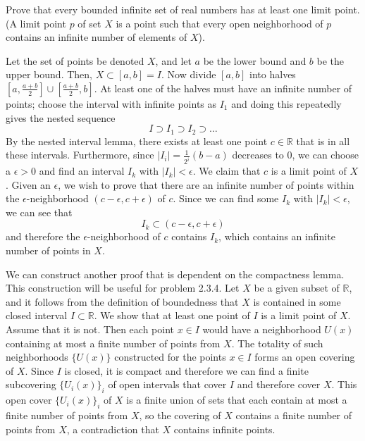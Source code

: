   \begin{exercise}
    Prove that every bounded infinite set of real numbers has at least one limit point. (A limit point $p$ of set $X$ is a point such that every open neighborhood of $p$ contains an infinite number of elements of $X$). 
  \end{exercise}
  \begin{solution}
    Let the set of points be denoted $X$, and let $a$ be the lower bound and $b$ be the upper bound. Then, $X \subset [a, b] = I$. Now divide $[a, b]$ into halves $[a, \frac{a + b}{2}] \cup [\frac{a + b}{2}, b]$. At least one of the halves must have an infinite number of points; choose the interval with infinite points as $I_1$ and doing this repeatedly gives the nested sequence 
    \begin{equation}
      I \supset I_1 \supset I_2 \supset \ldots
    \end{equation}
    By the nested interval lemma, there exists at least one point $c \in \mathbb{R}$ that is in all these intervals. Furthermore, since $|I_i| = \frac{1}{2^i} (b - a)$ decreases to $0$, we can choose a $\epsilon > 0$ and find an interval $I_k$ with $|I_k| < \epsilon$. We claim that $c$ is a limit point of $X$. Given an $\epsilon$, we wish to prove that there are an infinite number of points within the $\epsilon$-neighborhood $(c - \epsilon, c + \epsilon)$ of $c$. Since we can find some $I_k$ with $|I_k| < \epsilon$, we can see that 
    \begin{equation}
      I_k \subset (c - \epsilon, c + \epsilon)
    \end{equation}
    and therefore the $\epsilon$-neighborhood of $c$ contains $I_k$, which contains an infinite number of points in $X$. 

    We can construct another proof that is dependent on the compactness lemma. This construction will be useful for problem 2.3.4. Let $X$ be a given subset of $\mathbb{R}$, and it follows from the definition of boundedness that $X$ is contained in some closed interval $I \subset \mathbb{R}$. We show that at least one point of $I$ is a limit point of $X$. Assume that it is not. Then each point $x \in I$ would have a neighborhood $U(x)$ containing at most a finite number of points from $X$. The totality of such neighborhoods $\{U(x)\}$ constructed for the points $x \in I$ forms an open covering of $X$. Since $I$ is closed, it is compact and therefore we can find a finite subcovering $\{U_i(x)\}_{i}$ of open intervals that cover $I$ and therefore cover $X$. This open cover $\{U_i(x)\}_{i}$ of $X$ is a finite union of sets that each contain at most a finite number of points from $X$, so the covering of $X$ contains a finite number of points from $X$, a contradiction that $X$ contains infinite points. 
  \end{solution}

